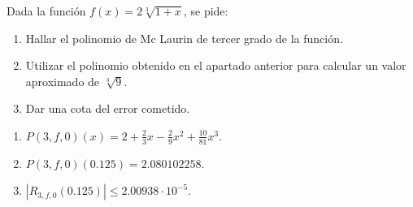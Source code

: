 {Dada  la función $f(x) = 2\sqrt[3]{{1 + x}}$, se pide:
\begin{enumerate}
\item Hallar el polinomio de Mc Laurin de tercer grado de la función. 
\item Utilizar el polinomio obtenido en el apartado anterior para calcular un valor aproximado de $\sqrt[3]{9}$.
\item Dar una cota del error cometido.
\end{enumerate}
}
{\begin{enumerate}
\item $P(3,f,0)(x)=2+\frac{2}{3}x-\frac{2}{9}x^2+\frac{10}{81}x^3$.
\item $P(3,f,0)(0.125)= 2.080102258$.
\item $|R_{3,f,0}(0.125)| \leq 2.00938\cdot 10^{-5}$.
\end{enumerate}
}
